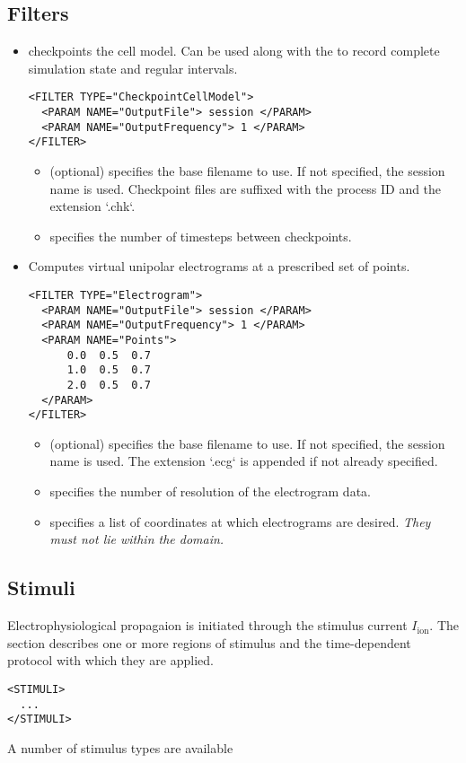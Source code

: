\subsection{Filters}
\begin{itemize}
    \item {} checkpoints the cell model. Can be
    used along with the  to record complete simulation
    state and regular intervals.
\begin{lstlisting}[style=XmlStyle]
<FILTER TYPE="CheckpointCellModel">
  <PARAM NAME="OutputFile"> session </PARAM>
  <PARAM NAME="OutputFrequency"> 1 </PARAM>
</FILTER>
\end{lstlisting}
    \begin{itemize}
        \item {} (optional) specifies the base filename to use.
    If not specified, the session name is used. Checkpoint files are suffixed with the process ID and the extension `.chk`.
        \item {} specifies the number of timesteps between
    checkpoints.
    \end{itemize}
    
    \item {} Computes virtual unipolar electrograms at a
     prescribed set of points.
\begin{lstlisting}[style=XmlStyle]
<FILTER TYPE="Electrogram">
  <PARAM NAME="OutputFile"> session </PARAM>
  <PARAM NAME="OutputFrequency"> 1 </PARAM>
  <PARAM NAME="Points">
      0.0  0.5  0.7
      1.0  0.5  0.7
      2.0  0.5  0.7
  </PARAM>
</FILTER>
\end{lstlisting}
    \begin{itemize}
    \item {} (optional) specifies the base filename to use. If
    not specified, the session name is used. The extension `.ecg` is appended if not already specified.
    \item {} specifies the number of resolution of the
    electrogram data.
    \item {} specifies a list of coordinates at which electrograms
    are desired. \emph{They must not lie within the domain.}
    \end{itemize}
\end{itemize}


\subsection{Stimuli}
Electrophysiological propagaion is initiated through the stimulus current 
$I_{\mathrm{ion}}$. The  section describes one or more regions of
stimulus and the time-dependent protocol with which they are applied.
\begin{lstlisting}[style=XmlStyle]
<STIMULI>
  ...
</STIMULI>
\end{lstlisting}
A number of stimulus types are available

